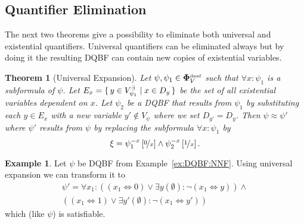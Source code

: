 \documentclass[
  digital, %
  twoside, %
  table,   %
  nolof,     %
  nolot,     %
]{fithesis3}
\let\setbuilder\set
\newcommand{\simpleset}[1]{\{{#1}\}}
\renewcommand{\set}[1]{\normalexpandarg\IfSubStr{#1}{|}{\setbuilder{#1}}{\simpleset{#1}}}
\newtheorem{theorem}{Theorem}[chapter] %
\theoremstyle{definition}
\newtheorem{example}{Example}
\theoremstyle{remark}
\newcommand{\substitute}[2]{\left[ \nicefrac{#2}{#1} \right]}
\newcommand{\DQBF}[1]{\mathbf{\Phi}_{#1}^{\text{\tiny dnnf}}}
\newcommand{\evars}[1]{V_{#1}^{\exists}}
\newcommand{\lequal}{\Leftrightarrow}
\begin{document}
\subsection{Quantifier Elimination}
The next two theorems give a possibility to eliminate both universal and existential quantifiers. Universal quantifiers can be eliminated always but by doing it the resulting DQBF can contain new copies of existential variables.

\begin{theorem}[Universal Expansion]
  Let $\psi, \psi_1 \in \DQBF{V}$ such that $\forall x : \psi_1$ is a subformula of $\psi$. Let $E_{x} = \set{y \in \evars{\psi_1} | x \in D_y}$ be the set of all existential variables dependent on $x$. Let $\psi_2$ be a DQBF that results from $\psi_1$ by substituting each $y \in E_x$ with a new variable $y' \not\in V_{\psi}$ where we set $D_{y'} = D_y$. Then $\psi \approx \psi'$ where $\psi'$ results from $\psi$ by replacing the subformula $\forall x : \psi_1$ by 
  \[\xi = \psi_1^{-x}\substitute{x}{0} \land \psi_2^{-x}\substitute{x}{1}.\]
\end{theorem}
\begin{example}
Let $\psi$ be DQBF from Example~\ref{ex:DQBF:NNF}. Using universal expansion we can transform it to
\begin{multline*}
    \psi' = \forall x_1 : ((x_1 \lequal 0) \lor \exists y (\emptyset) : \neg(x_1 \lequal y)) \land\\
    ((x_1 \lequal 1) \lor \exists y' (\emptyset) : \neg(x_1 \lequal y'))
\end{multline*}
which (like $\psi$) is satisfiable.
\end{example}
\end{document}
